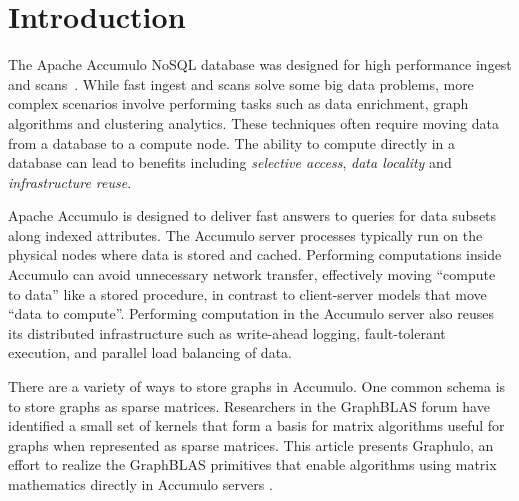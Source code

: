 
\section{Introduction}
\label{sIntro}
% 


The Apache Accumulo NoSQL database
was designed for high performance ingest and scans~\cite{sen2013benchmarking}. 
While fast ingest and scans solve some big data problems,
more complex scenarios involve performing tasks
such as data enrichment, graph algorithms and clustering analytics. These techniques
often require moving data from a database %
to a compute node. The ability to
compute directly in a database can lead to benefits including 
\emph{selective access}, \emph{data locality} and \emph{infrastructure reuse}. 

Apache Accumulo is designed to deliver
fast answers to queries for data subsets along indexed attributes. 
The Accumulo server processes typically run on the physical nodes where data is stored and cached.
Performing computations inside Accumulo can avoid unnecessary network transfer,
effectively moving ``compute to data'' like a stored procedure,
in contrast to client-server models that move ``data to compute''.
Performing computation in the Accumulo server also reuses its distributed infrastructure
such as write-ahead logging, fault-tolerant execution, and 
parallel load balancing of data.

There are a variety of ways to store graphs in Accumulo.  One common schema is
to store graphs as sparse matrices.  
Researchers in the GraphBLAS forum \cite{mattson2014standards} 
have identified a small set of kernels
that form a basis for matrix algorithms useful for graphs
when represented as sparse matrices.
This article presents Graphulo, an effort to realize the GraphBLAS primitives 
that enable algorithms using matrix mathematics directly in Accumulo servers \cite{gadepally2015gabb}.

